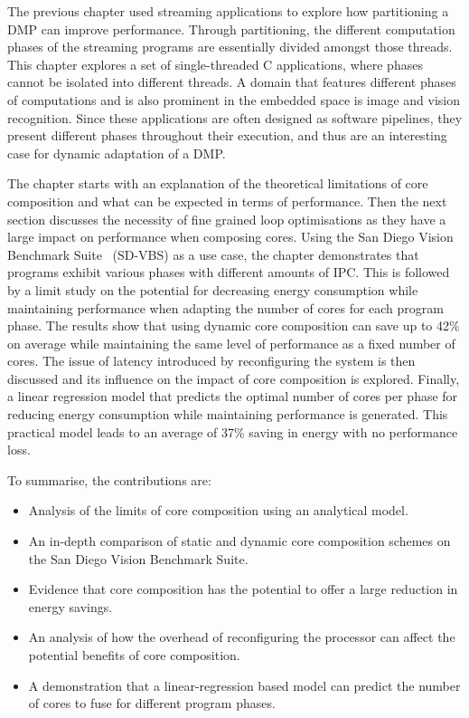 The previous chapter used streaming applications to explore how partitioning a DMP can improve performance.
Through partitioning, the different computation phases of the streaming programs are essentially divided amongst those threads.
This chapter explores a set of single-threaded C applications, where phases cannot be isolated into different threads.
A domain that features different phases of computations and is also prominent in the embedded space is image and vision recognition.
Since these applications are often designed as software pipelines, they present different phases throughout their execution, and thus are an interesting case for dynamic adaptation of a DMP.

The chapter starts with an explanation of the theoretical limitations of core composition and what can be expected in terms of performance.
Then the next section discusses the necessity of fine grained loop optimisations as they have a large impact on performance when composing cores.
Using the San Diego Vision Benchmark Suite~\cite{sdvbs} (SD-VBS) as a use case, the chapter demonstrates that programs exhibit various phases with different amounts of IPC.
This is followed by a limit study on the potential for decreasing energy consumption while maintaining performance when adapting the number of cores for each program phase.
The results show that using dynamic core composition can save up to 42\% on average while maintaining the same level of performance as a fixed number of cores.
The issue of latency introduced by reconfiguring the system is then discussed and its influence on the impact of core composition is explored.
Finally, a linear regression model that predicts the optimal number of cores per phase for reducing energy consumption while maintaining performance is generated.
This practical model leads to an average of 37\% saving in energy with no performance loss.

To summarise, the contributions are:
\vspace{-1em}
\begin{itemize}
\item Analysis of the limits of core composition using an analytical model.
\vspace{-1em}
\item An in-depth comparison of static and dynamic core composition schemes on the San Diego Vision Benchmark Suite.
\vspace{-1em}
\item Evidence that core composition has the potential to offer a large reduction in energy savings.
\vspace{-1em}
\item An analysis of how the overhead of reconfiguring the processor can affect the potential benefits of core composition.
\vspace{-1em}
\item A demonstration that a linear-regression based model can predict the number of cores to fuse for different program phases.
\end{itemize}
